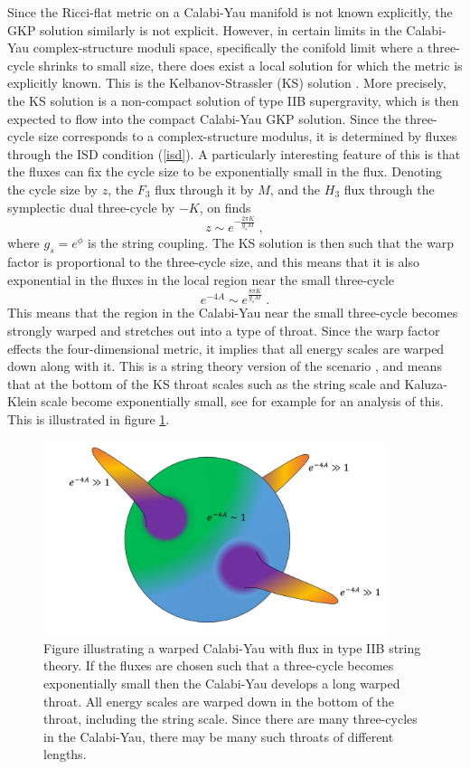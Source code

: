 \documentclass[11pt,a4paper]{article}
\numberwithin{equation}{section}
\numberwithin{table}{section}\setlength{\multlinegap}{25pt}
\newcommand{\be}{\begin{equation}}
\newcommand{\ee}{\end{equation}}
\begin{document}
Since the Ricci-flat metric on a Calabi-Yau manifold is not known explicitly, the GKP solution similarly is not explicit. However, in certain limits in the Calabi-Yau complex-structure moduli space, specifically the conifold limit where a three-cycle shrinks to small size, there does exist a local solution for which the metric is explicitly known. This is the Kelbanov-Strassler (KS) solution \cite{Klebanov:2000hb}. More precisely, the KS solution is a non-compact solution of type IIB supergravity, which is then expected to flow into the compact Calabi-Yau GKP solution. Since the three-cycle size corresponds to a complex-structure modulus, it is determined by fluxes through the ISD condition (\ref{isd}). A particularly interesting feature of this is that the fluxes can fix the cycle size to be exponentially small in the flux.  Denoting the cycle size by $z$, the $F_3$ flux through it by $M$, and the $H_3$ flux through the symplectic dual three-cycle by $-K$, on finds \cite{Giddings:2001yu}
\be
z \sim e^{-\frac{2\pi K}{g_s M}} \;, 
\ee
where $g_s=e^{\phi}$ is the string coupling. The KS solution is then such that the warp factor is proportional to the three-cycle size, and this means that it is also exponential in the fluxes in the local region near the small three-cycle
\be
e^{-4A} \sim e^{\frac{8\pi K}{g_s M}} \;.
\ee
This means that the region in the Calabi-Yau near the small three-cycle becomes strongly warped and stretches out into a type of throat. Since the warp factor effects the four-dimensional metric, it implies that all energy scales are warped down along with it. This is a string theory version of the scenario \cite{Randall:1999ee}, and means that at the bottom of the KS throat scales such as the string scale and Kaluza-Klein scale become exponentially small, see for example \cite{Burgess:2006mn} for an analysis of this. This is illustrated in figure \ref{fig:wcyt}.  
\begin{figure}[t]
\centering
 \includegraphics[width=0.9\textwidth]{wcyks.pdf}
\caption{Figure illustrating a warped Calabi-Yau with flux in type IIB string theory. If the fluxes are chosen such that a three-cycle becomes exponentially small then the Calabi-Yau develops a long warped throat. All energy scales are warped down in the bottom of the throat, including the string scale. Since there are many three-cycles in the Calabi-Yau, there may be many such throats of different lengths.}
\label{fig:wcyt}
\end{figure}
\end{document}

